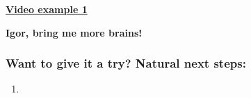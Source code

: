 \documentclass[mathserif, aspectratio=169]{beamer}
\newcommand{\mysection}[1]{\begin{frame} \begin{center} \vspace{3em} \textbf{#1} \end{center} \end{frame}}
\newcommand{\videosection}[3]{\begin{frame} \begin{center} \vspace{3em} \href{#2}{\textcolor{rognesred}{\textbf{#1}}} \end{center} #3 \end{frame}}
\begin{document}
\mysection{}

\mysection{}

\mysection{}

\videosection{Video example 1}{}{}

\mysection{Igor, bring me more brains!}
 
\begin{frame}
\frametitle{Want to give it a try? Natural next steps:}
\begin{enumerate}
\item
\end{enumerate}
\end{frame}

\end{document}
